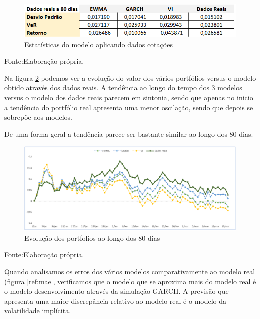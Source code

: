\documentclass[
  12pt,
  a4paper,
  openany]{book}
\begin{document}
\begin{figure}

{\centering \includegraphics[width=0.8\linewidth]{image/dadosreais80dias} 

}

\caption{Estatísticas do modelo aplicando dados cotações}\label{fig:dias}
\end{figure}
\FloatBarrier
\centering

Fonte:Elaboração própria.

\justifying
\bigskip

Na figura \ref{fig:grafico} podemos ver a evolução do valor dos vários portfólios versus o modelo obtido através dos dados reais. A tendência ao longo do tempo dos 3 modelos versus o modelo dos dados reais parecem em sintonia, sendo que apenas no inicio a tendência do portfólio real apresenta uma menor oscilação, sendo que depois se sobrepõe aos modelos.

De uma forma geral a tendência parece ser bastante similar ao longo dos 80 dias.

\begin{figure}

{\centering \includegraphics[width=0.8\linewidth]{image/graficofinal} 

}

\caption{Evolução dos portfolios ao longo dos 80 dias}\label{fig:grafico}
\end{figure}
\FloatBarrier
\centering

Fonte:Elaboração própria.

\justifying
\bigskip

Quando analisamos os erros dos vários modelos comparativamente ao modelo real (figura \ref{ref:mae}, verificamos que o modelo que se aproxima mais do modelo real é o modelo desenvolvimento através da simulação GARCH. A previsão que apresenta uma maior discrepância relativo ao modelo real é o modelo da volatilidade implícita.
\end{document}
